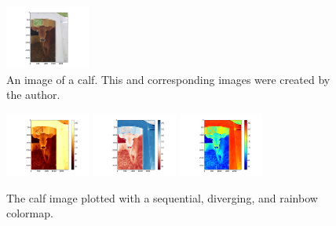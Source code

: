 \documentclass[journal]{IEEEtran}
\begin{document}
\par

%
\begin{figure}[H]
\centering
\includegraphics[width=1.1in]{calf_original}%
\caption{An image of a calf. This and corresponding images were created by the author.}
\end{figure}
%
\begin{figure}[H]
\includegraphics[width=1.1in]{calf_sequential}%
\hfil
\includegraphics[width=1.1in]{calf_diverging}%
\hfil
\includegraphics[width=1.1in]{calf_rainbow}%
\caption{The calf image plotted with a
sequential, diverging, and rainbow colormap.}
\end{figure}
\end{document}
